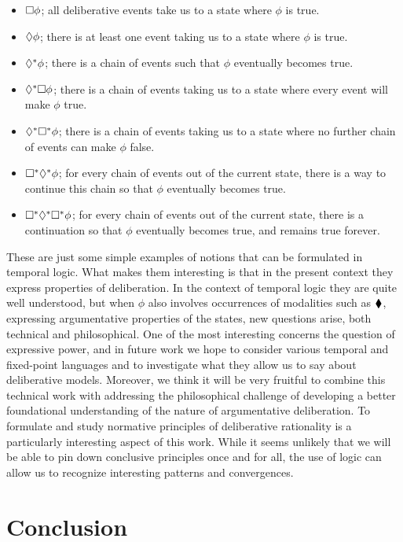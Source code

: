 \documentclass[greybox]{svmult}
\begin{document}
\begin{itemize}
\item $\square \phi$; all deliberative events take us to a state where $\phi$ is true.
\item $\lozenge \phi$; there is at least one event taking us to a state where $\phi$ is true.
\item $\lozenge^\ast \phi$; there is a chain of events such that $\phi$ eventually becomes true.
\item $\lozenge^\ast \square \phi$; there is a chain of events taking us to a state where every event will make $\phi$ true.
\item $\lozenge^\ast \square^\ast \phi$; there is a chain of events taking us to a state where no further chain of events can make $\phi$ false.
\item $\square^\ast \lozenge^\ast \phi$; for every chain of events out of the current state, there is a way to continue this chain so that $\phi$ eventually becomes true.
\item $\square^\ast \lozenge^\ast \square^\ast \phi$; for every chain of events out of the current state, there is a continuation so that $\phi$ eventually becomes true, and remains true forever.
\end{itemize}

These are just some simple examples of notions that can be formulated in temporal logic. What makes them interesting is that in the present context they express properties of deliberation. In the context of temporal logic they are quite well understood, but when $\phi$ also involves occurrences of modalities such as $\blacklozenge$, expressing argumentative properties of the states, new questions arise, both technical and philosophical. One of the most interesting concerns the question of expressive power, and in future work we hope to consider various temporal and fixed-point languages and to investigate what they allow us to say about deliberative models. Moreover, we think it will be very fruitful to combine this technical work with addressing the philosophical challenge of developing a better foundational understanding of the nature of argumentative deliberation. To formulate and study normative principles of deliberative rationality is a particularly interesting aspect of this work. While it seems unlikely that we will be able to pin down conclusive principles once and for all, the use of logic can allow us to recognize interesting patterns and convergences.

\section{Conclusion}\label{sec:conc}



\end{document}
